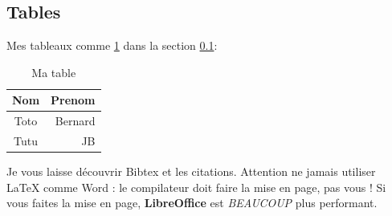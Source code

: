 \documentclass[a4paper,french,11pt]{article}
\begin{document}
\subsection{Tables}
\label{sec-tab}
Mes tableaux comme \ref{matable} dans la section \ref{sec-tab}:

\begin{table}[htp] %
\caption{Ma table}
\begin{center}
\begin{tabular}{|c|r|} %
\hline 
Nom&Prenom\\ \hline \hline 
Toto & Bernard \\
Tutu & JB \\ \hline 

\end{tabular}
\end{center}
\label{matable}
\end{table}%

Je vous laisse d\'ecouvrir Bibtex et les citations. Attention ne jamais utiliser LaTeX comme Word : le compilateur doit faire la mise en page, pas vous ! Si vous faites la mise en page, {\bf LibreOffice} est {\it BEAUCOUP} plus performant.
\end{document}
